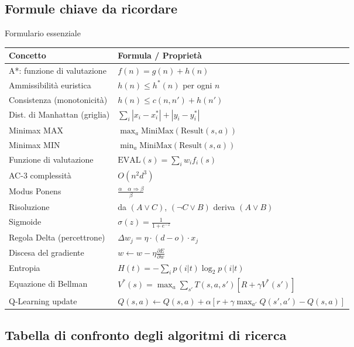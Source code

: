 \documentclass[12pt,a4paper]{article}
\begin{document}
\subsection{Formule chiave da ricordare}

\begin{formulabox}{Formulario essenziale}
\begin{center}
\renewcommand{\arraystretch}{1.4}
\begin{tabular}{ll}
\toprule
\textbf{Concetto} & \textbf{Formula / Proprietà} \\
\midrule
A*: funzione di valutazione & $f(n) = g(n) + h(n)$ \\
Ammissibilità euristica & $h(n) \leq h^*(n)$ per ogni $n$ \\
Consistenza (monotonicità) & $h(n) \leq c(n,n') + h(n')$ \\
Dist. di Manhattan (griglia) & $\sum_i |x_i - x_i^*| + |y_i - y_i^*|$ \\
Minimax MAX & $\max_{a} \text{MiniMax}(\text{Result}(s,a))$ \\
Minimax MIN & $\min_{a} \text{MiniMax}(\text{Result}(s,a))$ \\
Funzione di valutazione & $\text{EVAL}(s) = \sum_i w_i f_i(s)$ \\
AC-3 complessità & $O(n^2 d^3)$ \\
Modus Ponens & $\frac{\alpha \quad \alpha \Rightarrow \beta}{\beta}$ \\
Risoluzione & da $(A \lor C)$, $(\neg C \lor B)$ deriva $(A \lor B)$ \\
Sigmoide & $\sigma(z) = \frac{1}{1+e^{-z}}$ \\
Regola Delta (percettrone) & $\Delta w_j = \eta \cdot (d-o) \cdot x_j$ \\
Discesa del gradiente & $w \leftarrow w - \eta \frac{\partial E}{\partial w}$ \\
Entropia & $H(t) = -\sum_i p(i|t)\log_2 p(i|t)$ \\
Equazione di Bellman & $V^*(s) = \max_a \sum_{s'} T(s,a,s')[R + \gamma V^*(s')]$ \\
Q-Learning update & $Q(s,a) \leftarrow Q(s,a) + \alpha[r + \gamma\max_{a'}Q(s',a') - Q(s,a)]$ \\
\bottomrule
\end{tabular}
\end{center}
\end{formulabox}

\subsection{Tabella di confronto degli algoritmi di ricerca}
\end{document}
